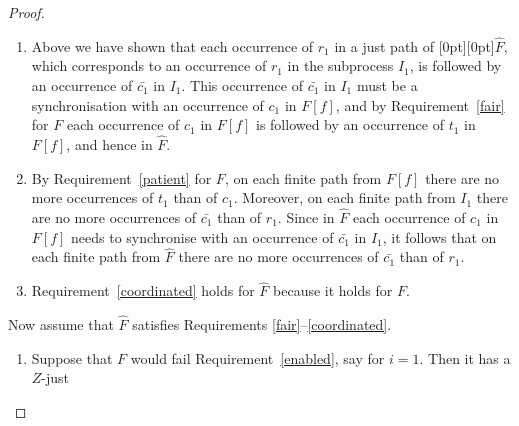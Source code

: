 \documentclass[smallcondensed]{svjour3}
\newcommand{\plat}[1]{\raisebox{0pt}[0pt][0pt]{#1}}  \def\precond#1{{\vphantom{#1}}^\bullet #1}
\newcommand{\Def}[1]{Definition~\ref{df:#1}}
\begin{document}
\begin{proof}
\begin{enumerate}
  So assume, towards a contradiction, that on a just path $\eta$ of \plat{$\widehat F$} an
  occurrence of $r_1$ is not followed by an occurrence of $\bar{c_1}$ in the subprocess $I_1$.
  By \Def{just path} $\eta$ must be $Y\!$-just for some $Y\subseteq\HC$.
  So $\eta$ can be decomposed into an $X$-just path $\eta_1$ of $I_1$, a $Z$-just path $\eta_0$ of
  $F[f]$ and a $W$-just path $\eta_2$ of $I_2$ for certain $X,Z,W\subseteq\HC$. By assumption, $\bar{c_1}\in X$.
  Moreover, $\eta_0$ can be decomposed into an $f^{-1}(Z)$-just path $\eta_F$ of $F$.
  Since in \plat{$\widehat F$} the $c_1$ of $F[f]$ requires synchronisation with the
  $\bar{c_1}$ of $I_1$, and $\eta_1$ has only finitely many occurrences of $\bar{c_1}$,
  it follows that $\eta_0$ has only finitely many occurrences of $c_1$, and thus that
  $\eta_F$ has only finitely many occurrences of $r_1$.
  Since $F$ satisfies Requirement~\ref{enabled}, saying that the system will always
  return to a state where it remains ready to accept the next request $r_1$ until it arrives,
  $r_1\in f^{-1}(Z)$. Hence $c_1\in Z$.
  By \Def{just path}, this contradicts the justness of $\eta$.
\item Above we have shown that each occurrence of $r_1$ in a just path of
  \plat{$\widehat F$}, which corresponds to an occurrence of $r_1$ in the subprocess $I_1$, is followed by
  an occurrence of $\bar{c_1}$ in $I_1$. This occurrence of $\bar{c_1}$ in $I_1$ must be a
  synchronisation with an occurrence of $c_1$ in $F[f]$, and by Requirement~\ref{fair} for $F$ each
  occurrence of $c_1$ in $F[f]$ is followed by an occurrence of $t_1$ in $F[f]$, and hence in $\widehat{F}$.
\item By Requirement~\ref{patient} for $F$, on each finite path from $F[f]$ there are no more
  occurrences of $t_1$ than of $c_1$. Moreover, on each finite path from $I_1$ there are no more
  occurrences of $\bar{c_1}$ than of $r_1$. Since in $\widehat F$ each occurrence of $c_1$ in $F[f]$ needs to
  synchronise with an occurrence of  $\bar{c_1}$ in $I_1$, it follows that on each finite path from
  $\widehat F$  there are no more occurrences of $\bar{c_1}$ than of $r_1$.
\item Requirement~\ref{coordinated} holds for $\widehat F$ because it holds for $F$.
\end{enumerate}
Now assume that $\widehat F$ satisfies Requirements \ref{fair}--\ref{coordinated}.
\begin{enumerate}
\item Suppose that $F$ would fail Requirement~\ref{enabled}, say for $i=1$. Then it has a $Z$-just

\end{enumerate}
\end{proof}
\end{document}
